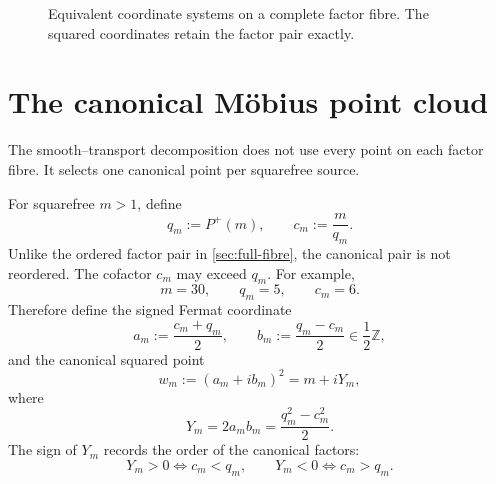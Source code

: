 \documentclass[11pt]{article}
\theoremstyle{definition}
\theoremstyle{remark}
\newcommand{\Pplus}{P^{+}}
\newcommand{\1}{\mathbf{1}}
\newcommand{\Z}{\mathbb{Z}}
\begin{document}
\begin{figure}[htbp]
\centering
{}
\caption{Equivalent coordinate systems on a complete factor fibre.  The squared coordinates retain the factor pair exactly.}
\label{fig:coordinate-map}
\end{figure}

\section{The canonical M\"obius point cloud}
\label{sec:canonical-cloud}

The smooth--transport decomposition does not use every point on each factor fibre.  It selects one canonical point per squarefree source.

For squarefree $m>1$, define
\begin{equation}
 q_m:=\Pplus(m),
 \qquad
 c_m:=\frac{m}{q_m}.
 \label{eq:canonical-cq}
\end{equation}
Unlike the ordered factor pair in \cref{sec:full-fibre}, the canonical pair is not reordered.  The cofactor $c_m$ may exceed $q_m$.  For example,
\[
 m=30,
 \qquad
 q_m=5,
 \qquad
 c_m=6.
\]
Therefore define the signed Fermat coordinate
\begin{equation}
 a_m:=\frac{c_m+q_m}{2},
 \qquad
 b_m:=\frac{q_m-c_m}{2}\in\frac12\Z,
 \label{eq:signed-Fermat}
\end{equation}
and the canonical squared point
\begin{equation}
 w_m:=(a_m+ib_m)^2
 =m+iY_m,
 \label{eq:canonical-w}
\end{equation}
where
\begin{equation}
 \boxed{Y_m=2a_mb_m=\frac{q_m^2-c_m^2}{2}.}
 \label{eq:signed-Y}
\end{equation}
The sign of $Y_m$ records the order of the canonical factors:
\begin{equation}
 Y_m>0\iff c_m<q_m,
 \qquad
 Y_m<0\iff c_m>q_m.
 \label{eq:Y-sign}
\end{equation}
\end{document}
